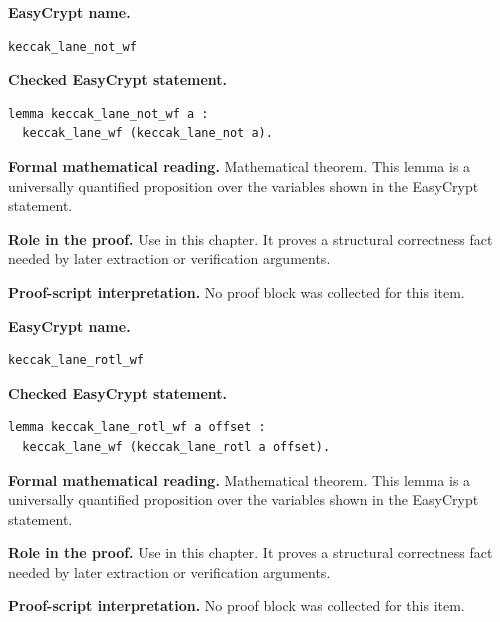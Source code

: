 \begin{formaltheorem}
\noindent\textbf{EasyCrypt name.}
\begin{lstlisting}[language=EasyCrypt,basicstyle=\ttfamily\scriptsize]
keccak_lane_not_wf
\end{lstlisting}
\noindent\textbf{Checked EasyCrypt statement.}
\begin{lstlisting}[language=EasyCrypt,basicstyle=\ttfamily\scriptsize]
lemma keccak_lane_not_wf a :
  keccak_lane_wf (keccak_lane_not a).
\end{lstlisting}
\noindent\textbf{Formal mathematical reading.}
Mathematical theorem. This lemma is a universally quantified proposition over the variables shown in the EasyCrypt statement.

\noindent\textbf{Role in the proof.}
Use in this chapter. It proves a structural correctness fact needed by later extraction or verification arguments.

\noindent\textbf{Proof-script interpretation.}
No proof block was collected for this item.

\end{formaltheorem}

\begin{formaltheorem}
\noindent\textbf{EasyCrypt name.}
\begin{lstlisting}[language=EasyCrypt,basicstyle=\ttfamily\scriptsize]
keccak_lane_rotl_wf
\end{lstlisting}
\noindent\textbf{Checked EasyCrypt statement.}
\begin{lstlisting}[language=EasyCrypt,basicstyle=\ttfamily\scriptsize]
lemma keccak_lane_rotl_wf a offset :
  keccak_lane_wf (keccak_lane_rotl a offset).
\end{lstlisting}
\noindent\textbf{Formal mathematical reading.}
Mathematical theorem. This lemma is a universally quantified proposition over the variables shown in the EasyCrypt statement.

\noindent\textbf{Role in the proof.}
Use in this chapter. It proves a structural correctness fact needed by later extraction or verification arguments.

\noindent\textbf{Proof-script interpretation.}
No proof block was collected for this item.

\end{formaltheorem}

